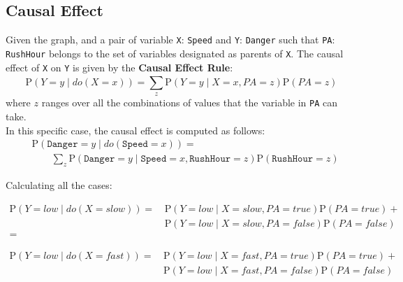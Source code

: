 \documentclass[a4paper,12pt]{article} %
\begin{document}
\subsection*{Causal Effect}
Given the graph, and a pair of variable \texttt{X}: \texttt{Speed} and \texttt{Y}: \texttt{Danger} such that \texttt{PA}: \texttt{RushHour} belongs to the set of variables designated as parents of \texttt{X}. The causal effect of \texttt{X} on \texttt{Y} is given by the \textbf{Causal Effect Rule}:
\begin{equation}
	\text{P}(Y = y \mid {do}(X = x)) = \sum_{z}^{}	\text{P}(Y = y \mid X = x, PA = z)\text{P}(PA = z)
\end{equation}
where $z$ ranges over all the combinations of values that the variable in \texttt{PA} can take.\\
In this specific case, the causal effect is computed as follows:
\begin{equation}
\begin{aligned}
&\text{P}(\mathtt{Danger} = y \mid {do}(\mathtt{Speed} = x)) =\\
& \qquad \sum_{z}^{}	\text{P}(\mathtt{Danger} = y \mid \mathtt{Speed} = x, \mathtt{RushHour} = z)\text{P}(\mathtt{RushHour} = z)
\end{aligned}
\end{equation}

\noindent Calculating all the cases:

\begin{equation*}\begin{aligned}
\text{P}(Y = \mathit{low} \mid {do}(X = \mathit{slow})) 
= \, & \text{P}(Y = \mathit{low} \mid X = \mathit{slow}, PA = \mathit{true})\text{P}(PA = \mathit{true}) +\\
& \text{P}(Y = \mathit{low} \mid X = \mathit{slow}, PA = \mathit{false})\text{P}(PA = \mathit{false}) \\
= \, & 
\end{aligned}\end{equation*}

\begin{equation*}\begin{aligned}
\text{P}(Y = \mathit{low} \mid {do}(X = \mathit{fast})) 
= \, & \text{P}(Y =  \mathit{low} \mid X = \mathit{fast}, PA = \mathit{true})\text{P}(PA = \mathit{true}) +\\
&  \text{P}(Y =  \mathit{low} \mid X = \mathit{fast}, PA = \mathit{false})\text{P}(PA = \mathit{false}) 
\end{aligned}\end{equation*}
\end{document}
